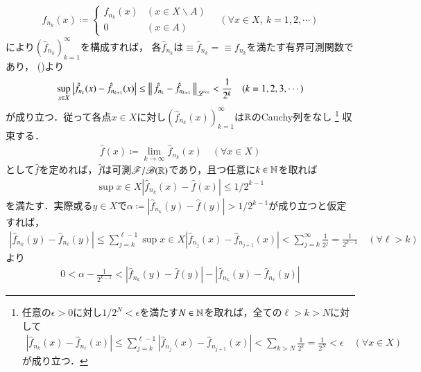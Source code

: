 \begin{prf}
\begin{description}
\begin{align}
				\hat{f}_{n_k}(x) \coloneqq
				\begin{cases}
					f_{n_k}(x) & (x \in X \backslash A) \\
					0 & (x \in A)
				\end{cases}
				\quad (\forall x \in X,\ k=1,2,\cdots)
			\end{align}
			により$\left( \hat{f}_{n_k} \right)_{k=1}^{\infty}$を構成すれば，
			各$\hat{f}_{n_k}$は$\equiv{\hat{f}_{n_k}}{} = \equiv{f_{n_k}}{}$を満たす有界可測関数であり，
			()より
			\begin{align}
				\operatorname*{sup}_{x \in X} \left|\hat{f}_{n_k}(x) - \hat{f}_{n_{k+1}}(x)\right|
				\leq \left\|\, \hat{f}_{n_k} - \hat{f}_{n_{k+1}}\, \right\|_{\mathscr{L}^\infty} < \frac{1}{2^k} \quad (k=1,2,3,\cdots) 
				\label{ineq:Lp_banach_1}
			\end{align}
			が成り立つ．従って各点$x \in X$に対し$\left( \hat{f}_{n_k}(x) \right)_{k=1}^{\infty}$は$\mathbb{R}$のCauchy列をなし
			\footnote{
				任意の$\epsilon > 0$に対し$1/2^N < \epsilon$を満たす$N \in \mathbb{N}$を取れば，全ての$\ell > k > N$に対して
				\begin{align}
					\left|\hat{f}_{n_k}(x) - \hat{f}_{n_{\ell}}(x)\right| 
					\leq \sum_{j=k}^{\ell-1}\left|\hat{f}_{n_j}(x) - \hat{f}_{n_{j+1}}(x)\right| 
					< \sum_{k > N} \frac{1}{2^k} = \frac{1}{2^N} < \epsilon
					\quad (\forall x \in X)
				\end{align}
				が成り立つ．
			}
			収束する．
			\begin{align}
				\hat{f}(x) \coloneqq \lim_{k \to \infty} \hat{f}_{n_k}(x)
				\quad (\forall x \in X)
			\end{align}
			として$\hat{f}$を定めれば，$\hat{f}$は可測$\mathscr{F}/\mathscr{B}(\mathbb{R})$であり，且つ任意に$k \in \mathbb{N}$を取れば
			\begin{align}
				\sup{x \in X}{|\hat{f}_{n_k}(x) - \hat{f}(x)|} \leq 1/2^{k-1} \label{ineq:Lp_banach_3}
			\end{align}
			を満たす．実際或る$y \in X$で$\alpha \coloneqq |\hat{f}_{n_k}(y) - \hat{f}(y)| > 1/2^{k-1}$が成り立つと仮定すれば，
			\begin{align}
				\left| \hat{f}_{n_k}(y) - \hat{f}_{n_\ell}(y) \right|
				\leq \sum_{j=k}^{\ell-1} \sup{x \in X}{\left|\hat{f}_{n_j}(x) - \hat{f}_{n_{j+1}}(x)\right|}
				< \sum_{j=k}^{\infty} \frac{1}{2^j}
				= \frac{1}{2^{k-1}}
				\quad (\forall \ell > k)
			\end{align}
			より
			\begin{align}
				0 < \alpha - \frac{1}{2^{k-1}} < \left| \hat{f}_{n_k}(y) - \hat{f}(y) \right| - \left| \hat{f}_{n_k}(y) - \hat{f}_{n_\ell}(y) \right|

\end{align}
\end{description}
\end{prf}

